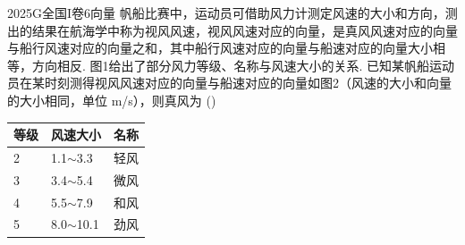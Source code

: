 
\begin{problem}{2025}{G}{全国I卷}{6}{向量}
帆船比赛中，运动员可借助风力计测定风速的大小和方向，测出的结果在航海学中称为视风风速，视风风速对应的向量，是真风风速对应的向量与船行风速对应的向量之和，其中船行风速对应的向量与船速对应的向量大小相等，方向相反. 图1给出了部分风力等级、名称与风速大小的关系. 已知某帆船运动员在某时刻测得视风风速对应的向量与船速对应的向量如图2（风速的大小和向量的大小相同，单位 m/s），则真风为
(\hspace{1cm})
\begin{choices}
\end{choices}
\begin{center}
\begin{tabular}{|l|l|l|}
\hline
等级 & 风速大小 & 名称 \\
\hline
2 & 1.1$\sim$3.3 & 轻风 \\
\hline
3 & 3.4$\sim$5.4 & 微风 \\
\hline
4 & 5.5$\sim$7.9 & 和风 \\
\hline
5 & 8.0$\sim$10.1 & 劲风 \\
\hline
\end{tabular}
\end{center}
\end{problem}